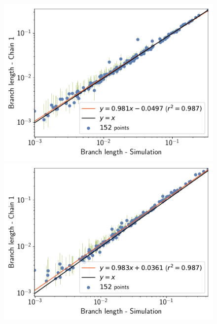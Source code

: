\documentclass{article}
\begin{document}
\begin{figure}[t]
    \centering
    \begin{minipage}{0.32\linewidth}
        \includegraphics[width=\linewidth, page=1]{simulations/BranchWise_SimuDiv_SiteMutSelBranchNe_BranchCorrelation_Log10BranchLength}
    \end{minipage}
    \hfill
    \begin{minipage}{0.32\linewidth}
        \includegraphics[width=\linewidth, page=1]{simulations/SimuPoly_SiteMutSelBranchNe_BranchCorrelation_Log10BranchLength}
    \end{minipage}
    \hfill

\end{figure}
\end{document}
